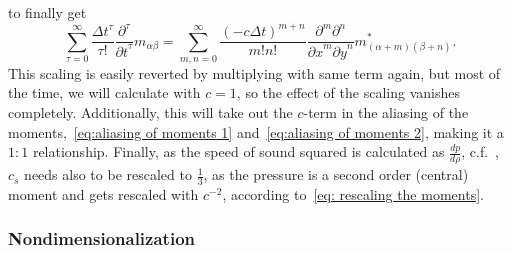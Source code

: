 to finally get
\begin{equation}
  \label{eq: Taylor of moments}
  \sum_{\tau = 0}^\infty \frac{{\Delta t}^\tau }{\tau!} \frac{\partial^\tau}{{\partial t}^\tau} m_{\alpha\beta} =
 \sum_{m,n = 0}^\infty \frac{{(- c\Delta t)}^{m+n}} {m!n!} \frac{\partial^m \partial^n}{ {\partial x}^m{\partial y}^n} m^*_{(\alpha + m)(\beta + n)}.
\end{equation}
This scaling is easily reverted by multiplying with same term again, but most of the time, we will calculate with $c=1$, so the effect of the scaling vanishes completely.
Additionally, this will take out the $c$-term in the aliasing of the moments,~\eqref{eq:aliasing of moments 1} and~\eqref{eq:aliasing of moments 2}, making it a $1:1$ relationship.
Finally, as the speed of sound squared is calculated as $\frac{dp}{d\rho}$, c.f.~\cite[page 175]{wolf2000lattice}, $c_s$ needs also to be rescaled to $\frac{1}{3}$, as the pressure is a second order (central) moment and gets rescaled with $c^{-2}$, according to~\eqref{eq: rescaling the moments}.

\subsubsection{Nondimensionalization}
\label{subs:Nondimensionalization}


